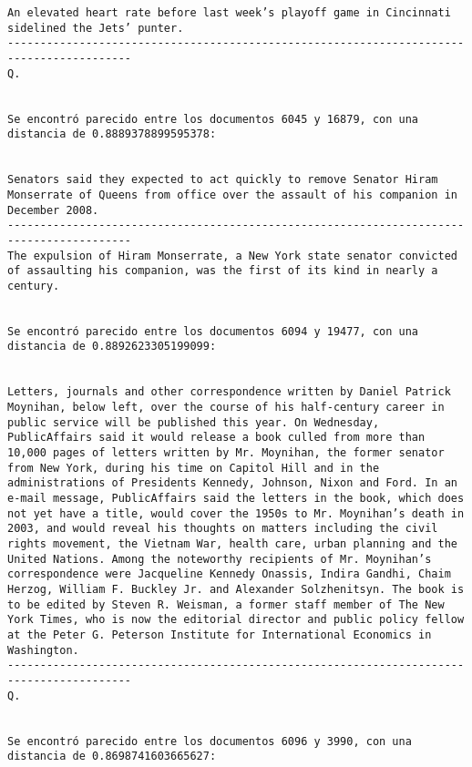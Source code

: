\documentclass[11pt]{article}
\begin{document}
\begin{Verbatim}[commandchars=\\\{\}]
An elevated heart rate before last week’s playoff game in Cincinnati sidelined the Jets’ punter.
-----------------------------------------------------------------------------------------
Q.


Se encontró parecido entre los documentos 6045 y 16879, con una distancia de 0.8889378899595378:


Senators said they expected to act quickly to remove Senator Hiram Monserrate of Queens from office over the assault of his companion in December 2008.
-----------------------------------------------------------------------------------------
The expulsion of Hiram Monserrate, a New York state senator convicted of assaulting his companion, was the first of its kind in nearly a century.


Se encontró parecido entre los documentos 6094 y 19477, con una distancia de 0.8892623305199099:


Letters, journals and other correspondence written by Daniel Patrick Moynihan, below left, over the course of his half-century career in public service will be published this year. On Wednesday, PublicAffairs said it would release a book culled from more than 10,000 pages of letters written by Mr. Moynihan, the former senator from New York, during his time on Capitol Hill and in the administrations of Presidents Kennedy, Johnson, Nixon and Ford. In an e-mail message, PublicAffairs said the letters in the book, which does not yet have a title, would cover the 1950s to Mr. Moynihan’s death in 2003, and would reveal his thoughts on matters including the civil rights movement, the Vietnam War, health care, urban planning and the United Nations. Among the noteworthy recipients of Mr. Moynihan’s correspondence were Jacqueline Kennedy Onassis, Indira Gandhi, Chaim Herzog, William F. Buckley Jr. and Alexander Solzhenitsyn. The book is to be edited by Steven R. Weisman, a former staff member of The New York Times, who is now the editorial director and public policy fellow at the Peter G. Peterson Institute for International Economics in Washington.
-----------------------------------------------------------------------------------------
Q.


Se encontró parecido entre los documentos 6096 y 3990, con una distancia de 0.8698741603665627:



\end{Verbatim}
\end{document}

